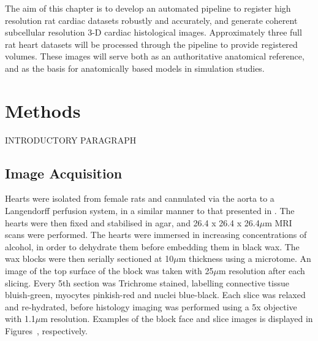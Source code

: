   The aim of this chapter is to develop an automated pipeline to register high resolution rat cardiac datasets robustly and accurately, and generate coherent subcellular resolution 3-D cardiac histological images.  Approximately three full rat heart datasets will be processed through the pipeline to provide registered volumes. These images will serve both as an authoritative anatomical reference, and as the basis for anatomically based models in simulation studies.
  
\section{Methods} %
\label{sec:methods}
  INTRODUCTORY PARAGRAPH
  
  \subsection{Image Acquisition} %
  \label{sub:image_acquisition}
    Hearts were isolated from female rats and cannulated via the aorta to a Langendorff perfusion system, in a similar manner to that presented in \cite{Burton2006}. The hearts were then fixed and stabilised in agar, and 26.4 x 26.4 x 26.4$\mu$m MRI scans were performed. The hearts were immersed in increasing concentrations of alcohol, in order to dehydrate them before embedding them in black wax. The wax blocks were then serially sectioned at 10$\mu$m thickness using a microtome. An image of the top surface of the block was taken with 25$\mu$m resolution after each slicing. Every 5th section was Trichrome stained, labelling connective tissue bluish-green, myocytes pinkish-red and nuclei blue-black. Each slice was relaxed and re-hydrated, before histology imaging was performed using a 5x objective with 1.1$\mu$m resolution. Examples of the block face and slice images is displayed in Figures~, respectively.
		
